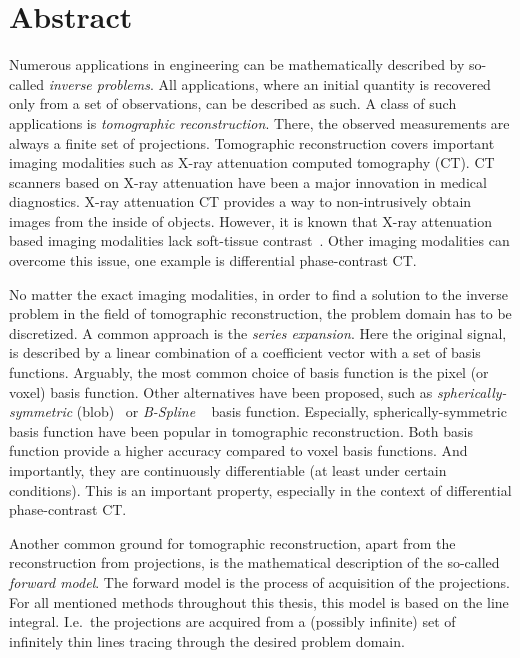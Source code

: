 \chapter{Abstract}

\noindent%
Numerous applications in engineering can be mathematically described by so-called \textit{inverse
	problems}. All applications, where an initial quantity is recovered only from a set of observations,
can be described as such. A class of such applications is \textit{tomographic reconstruction}.
There, the observed measurements are always a finite set of projections. Tomographic reconstruction
covers important imaging modalities such as X-ray attenuation computed tomography (CT). CT scanners
based on X-ray attenuation have been a major innovation in medical diagnostics. X-ray attenuation CT
provides a way to non-intrusively obtain images from the inside of objects. However, it is known
that X-ray attenuation based imaging modalities lack soft-tissue
contrast~\cite{pfeiffer_phase_2006}. Other imaging modalities can overcome this issue, one example
is differential phase-contrast CT\@.

No matter the exact imaging modalities, in order to find a solution to the inverse problem in the
field of tomographic reconstruction, the problem domain has to be discretized. A common approach is
the \textit{series expansion}. Here the original signal, is described by a linear combination of a
coefficient vector with a set of basis functions. Arguably, the most common choice of basis function
is the pixel (or voxel) basis function. Other alternatives have been proposed, such as
\textit{spherically-symmetric} (blob)~\cite{lewitt_multidimensional_1990} or \textit{B-Spline}
~\cite{unser_fast_1991} basis function. Especially, spherically-symmetric basis function have been
popular in tomographic reconstruction. Both basis function provide a higher accuracy compared to
voxel basis functions. And importantly, they are continuously differentiable (at least under certain
conditions). This is an important property, especially in the context of differential phase-contrast
CT\@.

Another common ground for tomographic reconstruction, apart from the reconstruction from
projections, is the mathematical description of the so-called \textit{forward model}. The forward
model is the process of acquisition of the projections. For all mentioned methods throughout this
thesis, this model is based on the line integral. I.e.\ the projections are acquired from a
(possibly infinite) set of infinitely thin lines tracing through the desired problem domain.

